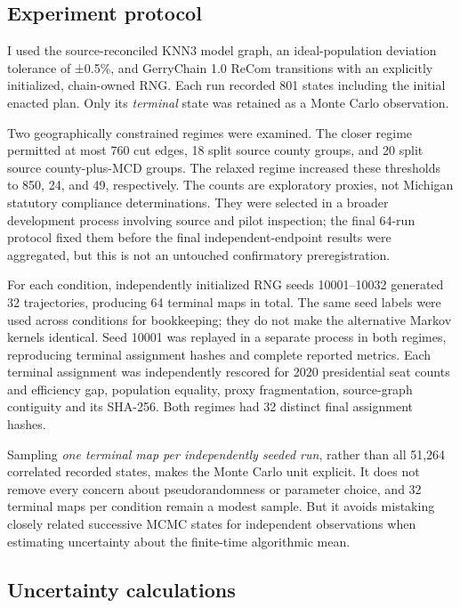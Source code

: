 \documentclass[
  10pt,
]{article}
\begin{document}
\hypertarget{experiment-protocol}{%
\subsection{Experiment protocol}\label{experiment-protocol}}

I used the source-reconciled KNN3 model graph, an ideal-population
deviation tolerance of ±0.5\%, and GerryChain 1.0 ReCom transitions with
an explicitly initialized, chain-owned RNG. Each run recorded 801 states
including the initial enacted plan. Only its \emph{terminal} state was
retained as a Monte Carlo observation.

Two geographically constrained regimes were examined. The closer regime
permitted at most 760 cut edges, 18 split source county groups, and 20
split source county-plus-MCD groups. The relaxed regime increased these
thresholds to 850, 24, and 49, respectively. The counts are exploratory
proxies, not Michigan statutory compliance determinations. They were
selected in a broader development process involving source and pilot
inspection; the final 64-run protocol fixed them before the final
independent-endpoint results were aggregated, but this is not an
untouched confirmatory preregistration.

For each condition, independently initialized RNG seeds 10001--10032
generated 32 trajectories, producing 64 terminal maps in total. The same
seed labels were used across conditions for bookkeeping; they do not
make the alternative Markov kernels identical. Seed 10001 was replayed
in a separate process in both regimes, reproducing terminal assignment
hashes and complete reported metrics. Each terminal assignment was
independently rescored for 2020 presidential seat counts and efficiency
gap, population equality, proxy fragmentation, source-graph contiguity
and its SHA-256. Both regimes had 32 distinct final assignment hashes.

Sampling \emph{one terminal map per independently seeded run}, rather
than all 51,264 correlated recorded states, makes the Monte Carlo unit
explicit. It does not remove every concern about pseudorandomness or
parameter choice, and 32 terminal maps per condition remain a modest
sample. But it avoids mistaking closely related successive MCMC states
for independent observations when estimating uncertainty about the
finite-time algorithmic mean.

\hypertarget{uncertainty-calculations}{%
\subsection{Uncertainty calculations}\label{uncertainty-calculations}}
\end{document}

